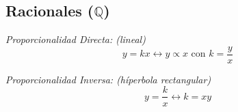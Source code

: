 \subsection{Racionales ($\mathbb{Q}$)}
\textit{Proporcionalidad Directa: (lineal)}\\
\begin{equation*}
y = kx \leftrightarrow y \propto x \text{ con } k = \frac{y}{x}
\end{equation*}

\textit{Proporcionalidad Inversa: (híperbola rectangular)}\\
\begin{equation*}
y = \frac{k}{x} \leftrightarrow k = xy
\end{equation*}\\